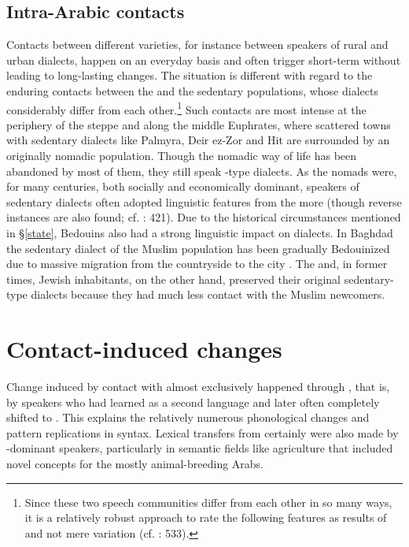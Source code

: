 \documentclass[output=paper]{langsci/langscibook}
\begin{document}
  \subsection{Intra-Arabic contacts} 

Contacts between different  varieties, for instance between speakers of rural and urban dialects, happen on an everyday basis and often trigger short-term  without leading to long-lasting changes. The situation is different with regard to the enduring contacts between the  and the sedentary populations, whose dialects considerably differ from each other.\footnote{Since these two speech communities differ from each other in so many ways, it is a relatively robust approach to rate the following features as results of  and not mere variation (cf. \citealt{Lucas2015}: 533).} Such contacts are most intense at the periphery of the  steppe and along the middle Euphrates, where scattered towns with sedentary dialects like Palmyra, Deir ez-Zor and Hit are surrounded by an originally nomadic population. Though the nomadic way of life has been abandoned by most of them, they still speak -type  dialects. As the nomads were, for many centuries, both socially and economically dominant, speakers of sedentary dialects often adopted linguistic features from the more   (though reverse instances are also found; cf. \citealt{Behnstedt1994Dialektkontakt}: 421). Due to the historical circumstances mentioned in §\ref{state}, Bedouins also had a strong linguistic impact on  dialects. In Baghdad the sedentary dialect of the Muslim population has been gradually Bedouinized due to massive migration from the countryside to the city \citep{Palva2009}. The  and, in former times, Jewish inhabitants, on the other hand, preserved their original sedentary-type dialects because they had much less contact with the Muslim newcomers. 

\section{Contact-induced changes} 

Change induced by contact with  almost exclusively happened through , that is, by  speakers who had learned  as a second language and later often completely shifted to . This explains the relatively numerous phonological changes and pattern replications in syntax. Lexical transfers from  certainly were also made by -dominant speakers, particularly in semantic fields like agriculture that included novel concepts for the mostly animal-breeding Arabs.
\end{document}
